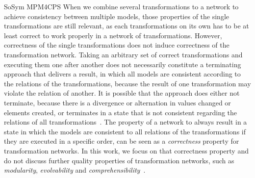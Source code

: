\begin{copiedFrom}{SoSym MPM4CPS}
When we combine several transformations to a network to achieve consistency between multiple models, those properties of the single transformations are still relevant, as each transformations on its own has to be at least correct to work properly in a network of transformations.
However, correctness of the single transformations does not induce correctness of the transformation network.
Taking an arbitrary set of correct transformations and executing them one after another does not necessarily constitute a terminating approach that delivers a result, in which all models are consistent according to the relations of the transformations, because the result of one transformation may violate the relation of another.
It is possible that the approach does either not terminate, because there is a divergence or alternation in values changed or elements created, or terminates in a state that is not consistent regarding the relations of all transformations~\cite{klare2019icmt}.
The property of a network to always result in a state in which the models are consistent to all relations of the transformations if they are executed in a specific order, can be seen as a \emph{correctness} property for transformation networks.
In this work, we focus on that correctness property and do not discuss further quality properties of transformation networks, such as \emph{modularity}, \emph{evolvability} and \emph{comprehensibility}~\cite{klare2018docsym}.



\end{copiedFrom}
